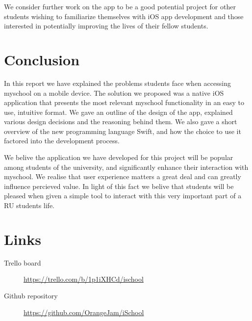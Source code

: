 \documentclass[pdftex, DIV=calc, paper=a4, fontsize=11pt, twocolumn]{scrartcl}	 %
\begin{document}
We consider further work on the app to be a good potential project for other students wishing to 
familiarize themselves with iOS app development and those interested in potentially improving the
lives of their fellow students. 

\section*{Conclusion}

In this report we have explained the problems students face when accessing myschool on a mobile 
device. The solution we proposed was a native iOS application that presents the most relevant 
myschool functionality in an easy to use, intuitive format. We gave an outline of the design of the
app, explained various design decisions and the reasoning behind them. We also gave a short overview
of the new programming language Swift, and how the choice to use it factored into the development 
process.

We belive the application we have
developed for this project will be popular among students of the university, and significantly
enhance their interaction with myschool. We realise that user experience matters a great deal and
can greatly influence percieved value. In light of this fact we belive that students will be pleased
when given a simple tool to interact with this very important part of a RU students life.


\section*{Links}

\begin{description}
    \item[Trello board] \url{https://trello.com/b/1p1iXHCd/ischool}
    \item[Github repository] \url{https://github.com/OrangeJam/iSchool}
\end{description}

\end{document}
